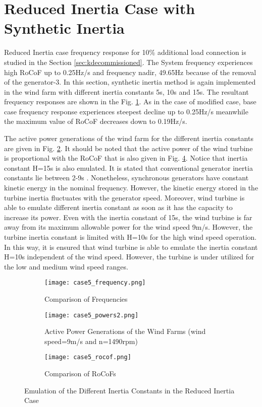 \section{Reduced Inertia Case with Synthetic Inertia}
Reduced Inertia case frequency response for 10\% additional load connection is studied in the Section \ref{sec:kdecommissioned}. The System frequency experiences high RoCoF up to 0.25Hz/s and frequency nadir, 49.65Hz because of the removal of the generator-3. In this section, synthetic inertia method is again implemented in the wind farm with different inertia constants 5s, 10s and 15s. The resultant frequency responses are shown in the Fig. \ref{Case5_freq}. As in the case of modified case, base case frequency response experiences steepest decline up to 0.25Hz/s meanwhile the maximum value of RoCoF decreases down to 0.19Hz/s. \par
The active power generations of the wind farm for the different inertia constants are given in Fig. \ref{Case5_power}. It should be noted that the active power of the wind turbine is proportional with the RoCoF that is also given in Fig. \ref{Case5_rocof}. Notice that inertia constant H=15s is also emulated. It is stated that conventional generator inertia constants lie between 2-9s \cite{Kundur}. Nonetheless, synchronous generators have constant kinetic energy in the nominal frequency. However, the kinetic energy stored in the turbine inertia fluctuates with the generator speed. Moreover, wind turbine is able to emulate different inertia constant as soon as it has the capacity to increase its power. Even with the inertia constant of 15s, the wind turbine is far away from its maximum allowable power for the wind speed 9m/s. However, the turbine inertia constant is limited with H=10s for the high wind speed operation. In this way, it is ensured that wind turbine is able to emulate the inertia constant H=10s independent of the wind speed. However, the turbine is under utilized for the low and medium wind speed ranges.
\begin{figure}[h!]
	\centering
	\begin{subfigure}{0.9\textwidth} %
		\centering	\texttt{[image: case5\_frequency.png]}
		\caption{Comparison of Frequencies}		
		\label{Case5_freq}
	\end{subfigure}
	\vspace{0.1em} %
	\begin{subfigure}{0.9\textwidth}
		\centering	\texttt{[image: case5\_powers2.png]}
		\caption{Active Power Generations of the Wind Farms (wind speed=9m/s and n=1490rpm)}
		\label{Case5_power}	
	\end{subfigure}
	\vspace{0.1em} %
	\begin{subfigure}{0.9\textwidth}
		\centering	
		\texttt{[image: case5\_rocof.png]}
		\caption{Comparison of RoCoFs}
		\label{Case5_rocof}	
	\end{subfigure}
	\caption{Emulation of the Different Inertia Constants in the Reduced Inertia Case}
\end{figure}
